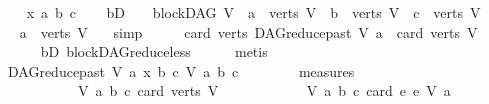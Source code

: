 \begin{isabellebody}
\ \ \isamarkupfalse%
\ x\ a\ b\ c\isanewline
\ \ \isamarkupfalse%
\ bD{\isacharcolon}{\kern0pt}\ {\isachardoublequoteopen}\ {\isasymnot}\ {\isacharparenleft}{\kern0pt}{\isasymnot}\ blockDAG\ V\ {\isasymor}\ a\ {\isasymnotin}\ verts\ V\ {\isasymor}\ b\ {\isasymnotin}\ verts\ V\ {\isasymor}\ c\ {\isasymnotin}\ verts\ V{\isacharparenright}{\kern0pt}{\isachardoublequoteclose}\isanewline
\ \ \isamarkupfalse%
\ \isamarkupfalse%
\ {\isachardoublequoteopen}a\ {\isasymin}\ verts\ V{\isachardoublequoteclose}\ \ \isamarkupfalse%
\ simp\isanewline
\ \ \isamarkupfalse%
\ \isamarkupfalse%
\ {\isachardoublequoteopen}card\ {\isacharparenleft}{\kern0pt}verts\ {\isacharparenleft}{\kern0pt}DAG{\isachardot}{\kern0pt}reduce{\isacharunderscore}{\kern0pt}past\ V\ a{\isacharparenright}{\kern0pt}{\isacharparenright}{\kern0pt}\ {\isacharless}{\kern0pt}\ card\ {\isacharparenleft}{\kern0pt}verts\ V{\isacharparenright}{\kern0pt}{\isachardoublequoteclose}\ \ \ \isanewline
\ \ \ \ \isamarkupfalse%
\ bD\ blockDAG{\isachardot}{\kern0pt}reduce{\isacharunderscore}{\kern0pt}less\isanewline
\ \ \ \ \isamarkupfalse%
\ metis\isanewline
\ \ \isamarkupfalse%
\ \isamarkupfalse%
\ {\isachardoublequoteopen}{\isacharparenleft}{\kern0pt}{\isacharparenleft}{\kern0pt}DAG{\isachardot}{\kern0pt}reduce{\isacharunderscore}{\kern0pt}past\ V\ a{\isacharcomma}{\kern0pt}\ x{\isacharcomma}{\kern0pt}\ b{\isacharcomma}{\kern0pt}\ c{\isacharparenright}{\kern0pt}{\isacharcomma}{\kern0pt}\ V{\isacharcomma}{\kern0pt}\ a{\isacharcomma}{\kern0pt}\ b{\isacharcomma}{\kern0pt}\ c{\isacharparenright}{\kern0pt}\isanewline
\ \ \ \ \ \ \ {\isasymin}\ measures\isanewline
\ \ \ \ \ \ \ \ \ \ \ {\isacharbrackleft}{\kern0pt}{\isasymlambda}{\isacharparenleft}{\kern0pt}V{\isacharcomma}{\kern0pt}\ a{\isacharcomma}{\kern0pt}\ b{\isacharcomma}{\kern0pt}\ c{\isacharparenright}{\kern0pt}{\isachardot}{\kern0pt}\ card\ {\isacharparenleft}{\kern0pt}verts\ V{\isacharparenright}{\kern0pt}{\isacharcomma}{\kern0pt}\isanewline
\ \ \ \ \ \ \ \ \ \ \ \ {\isasymlambda}{\isacharparenleft}{\kern0pt}V{\isacharcomma}{\kern0pt}\ a{\isacharcomma}{\kern0pt}\ b{\isacharcomma}{\kern0pt}\ c{\isacharparenright}{\kern0pt}{\isachardot}{\kern0pt}\ card\ {\isacharbraceleft}{\kern0pt}e{\isachardot}{\kern0pt}\ e\ {\isasymrightarrow}\isactrlsup {\isacharasterisk}{\kern0pt}\isactrlbsub V\isactrlesub \ a{\isacharbraceright}{\kern0pt}{\isacharbrackright}{\kern0pt}{\isachardoublequoteclose}\isanewline

\end{isabellebody}
